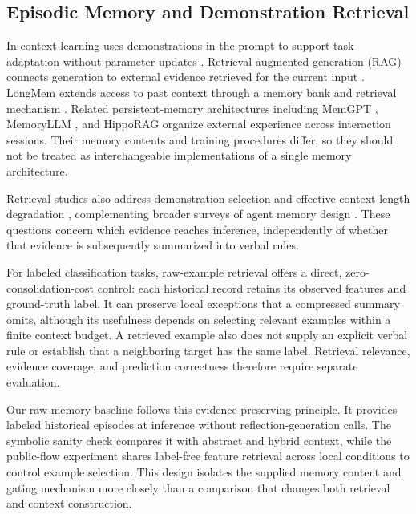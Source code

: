 \documentclass[10pt,a4paper,onecolumn]{article}
\theoremstyle{definition}
\theoremstyle{remark}
\begin{document}
\subsection{Episodic Memory and Demonstration Retrieval}
In-context learning uses demonstrations in the prompt to support task adaptation without parameter updates \cite{brown2020language}. Retrieval-augmented generation (RAG) connects generation to external evidence retrieved for the current input \cite{lewis2020retrieval}. LongMem extends access to past context through a memory bank and retrieval mechanism \cite{wang2023longmem}. Related persistent-memory architectures including MemGPT \cite{packer2023memgpt}, MemoryLLM \cite{wang2024memoryllm}, and HippoRAG \cite{gutierrez2024hipporag} organize external experience across interaction sessions. Their memory contents and training procedures differ, so they should not be treated as interchangeable implementations of a single memory architecture.

Retrieval studies also address demonstration selection \cite{zhang2022active,purohit2025sample} and effective context length degradation \cite{an2024why,liu2024lost,maharana2024evaluating}, complementing broader surveys of agent memory design \cite{wu2025from,zhang2024survey}. These questions concern which evidence reaches inference, independently of whether that evidence is subsequently summarized into verbal rules.

For labeled classification tasks, raw-example retrieval offers a direct, zero-consolidation-cost control: each historical record retains its observed features and ground-truth label. It can preserve local exceptions that a compressed summary omits, although its usefulness depends on selecting relevant examples within a finite context budget. A retrieved example also does not supply an explicit verbal rule or establish that a neighboring target has the same label. Retrieval relevance, evidence coverage, and prediction correctness therefore require separate evaluation.

Our raw-memory baseline follows this evidence-preserving principle. It provides labeled historical episodes at inference without reflection-generation calls. The symbolic sanity check compares it with abstract and hybrid context, while the public-flow experiment shares label-free feature retrieval across local conditions to control example selection. This design isolates the supplied memory content and gating mechanism more closely than a comparison that changes both retrieval and context construction.
\end{document}
